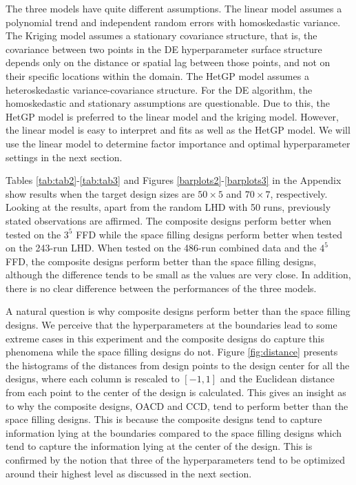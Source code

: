 \documentclass [PhD] {package/uclathes}
\begin{document}
The three models have quite different assumptions. The linear model assumes a polynomial trend and independent random errors with homoskedastic variance. The Kriging model assumes a stationary covariance structure, that is, the covariance between two points in the DE hyperparameter surface structure depends only on the distance or spatial lag between those points, and not on their specific locations within the domain. The HetGP model assumes a heteroskedastic variance-covariance structure. For the DE algorithm, the homoskedastic and stationary assumptions are questionable. Due to this, the HetGP model is preferred to the linear model and the kriging model. However, the linear model is easy to interpret and fits as well as the HetGP model. We will use the linear model to determine factor importance and optimal hyperparameter settings in the next section.



Tables \ref{tab:tab2}-\ref{tab:tab3} and
Figures \ref{barplots2}-\ref{barplots3} in the Appendix show results when the target design sizes are $50\times 5$ and $70\times7$, respectively.
Looking at the results, apart from the random LHD with 50 runs, previously stated observations are affirmed. The composite designs perform better when tested on the $3^5$ FFD while the space filling designs perform better when tested on the 243-run LHD. When tested on the  486-run combined data and the $4^5$ FFD, the composite designs perform better than the space filling designs, although the difference tends to be small as the values are very close. In addition, there is no clear difference between the performances of the three models.


A natural question is why composite designs perform better than the space filling designs. We perceive that the hyperparameters at the boundaries lead to some extreme cases in this experiment and the composite  designs do capture this phenomena while the space filling designs do not. Figure \ref{fig:distance} presents the histograms of the distances from design points to the design center for all the designs, where each column is rescaled to $[-1, 1]$ and  the Euclidean distance from each point to the center of the design is calculated. This gives an insight as to why the composite designs, OACD and CCD,  tend to perform better than the space filling designs. This is because the composite designs tend to capture information lying at the boundaries compared to the space filling designs which tend to capture the information lying at the center of the design. This is confirmed by the notion that three of the hyperparameters tend to be optimized around their highest level as discussed in the next section.
\end{document}
